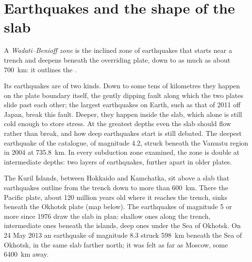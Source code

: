 \section{Earthquakes and the shape of the slab}\label{sec:b1:active-margins:seismicity}

\begin{definition}\label{def:b1:active-margins:wadati-benioff}
A \emph{Wadati--Benioff zone} is the inclined zone
of earthquakes that starts near a trench and deepens beneath the overriding
plate, down to as much as about \qty{700}{km}: it outlines the .
\end{definition}

Its earthquakes are of two kinds. Down to some tens of kilometres they happen on
the plate boundary itself, the gently dipping fault along which the two plates
slide past each other; the largest earthquakes on Earth, such as that of 2011
off Japan, break this fault. Deeper, they happen inside the slab, which alone is
still cold enough to store stress. At the greatest depths even the slab should
flow rather than break, and how deep earthquakes start is still debated. The
deepest earthquake of the catalogue, of magnitude 4.2, struck beneath the
Vanuatu region in 2004 at \qty{735.8}{km}. In every subduction zone examined,
the zone is double at intermediate depths: two layers of earthquakes, further
apart in older plates.

The Kuril Islands, between Hokkaido and Kamchatka, sit above a slab that
earthquakes outline from the trench down to more than \qty{600}{km}. There the Pacific plate, about 120 million years old where it
reaches the trench, sinks beneath the Okhotsk plate
(map below). The earthquakes of magnitude 5 or more since
1976 draw the slab in plan: shallow ones along the trench, intermediate ones
beneath the islands, deep ones under the Sea of Okhotsk. On 24 May 2013 an
earthquake of magnitude 8.3 struck \qty{598}{km} beneath the Sea of Okhotsk,
in the same slab farther north; it was felt as far as Moscow, some
\qty{6400}{km} away.

